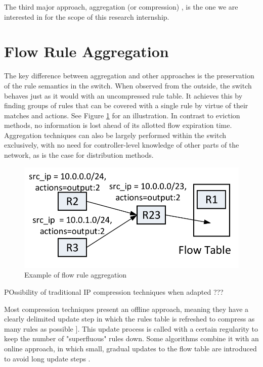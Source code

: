 The third major approach, aggregation (or compression) , is the one we are interested in for the scope of this research internship. 

\section{Flow Rule Aggregation}

The key difference between aggregation and other approaches is the preservation of the rule semantics in the switch. When observed from the outside, the switch behaves just as it would with an uncompressed rule table. It achieves this by finding groups of rules that can be covered with a single rule by virtue of their matches and actions. See Figure \ref{fig:AggregationIllustration} for an illustration. In contrast to eviction methods, no information is lost ahead of its allotted flow expiration time. Aggregation techniques can also be largely performed within the switch exclusively, with no need for controller-level knowledge of other parts of the network, as is the case for distribution methods.

\begin{figure}[h!]
  \centering
  \includegraphics[scale=0.4]{AggregationIllustration.PNG}
  \caption{Example of flow rule aggregation \cite{Nguyen2016}}
  \label{fig:AggregationIllustration}
\end{figure}

POssibility of traditional IP compression techniques when adapted ???

Most compression techniques present an offline approach, meaning they have a clearly delimited update step in which the rules table is refreshed to compress as many rules as possible \cite{Leng2017}]. This update process is called with a certain regularity to keep the number of "superfluous" rules down. Some algorithms combine it with an online approach, in which small, gradual updates to the flow table are introduced to avoid long update steps \cite{Liu2010} \cite{Luo2014}. 


